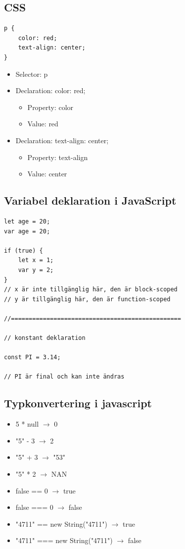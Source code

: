 \documentclass[12pt,a4paper]{article}
\begin{document}
\subsection{CSS}
\begin{verbatim}
p {
    color: red;
    text-align: center;
}
\end{verbatim}

\begin{itemize}
    \item Selector: p
    \item Declaration: color: red;
    \begin{itemize}
        \item Property: color
        \item Value: red
    \end{itemize}
    \item Declaration: text-align: center;
    \begin{itemize}
        \item Property: text-align
        \item Value: center
    \end{itemize}
\end{itemize}
\subsection{Variabel deklaration i JavaScript}
\begin{verbatim}
let age = 20;
var age = 20;

if (true) {
    let x = 1;
    var y = 2;
}
// x är inte tillgänglig här, den är block-scoped
// y är tillgänglig här, den är function-scoped

//================================================

// konstant deklaration

const PI = 3.14;

// PI är final och kan inte ändras

\end{verbatim}
\newpage

\subsection{Typkonvertering i javascript}
\begin{itemize}
    \item 5 * null $\rightarrow$ 0
    \item "5" - 3 $\rightarrow$ 2
    \item "5" + 3 $\rightarrow$ "53"
    \item "5" * 2 $\rightarrow$ NAN
    \item false == 0 $\rightarrow$ true
    \item false === 0 $\rightarrow$ false
    \item "4711" == new String("4711") $\rightarrow$ true
    \item "4711" === new String("4711") $\rightarrow$ false
\end{itemize}
\end{document}

